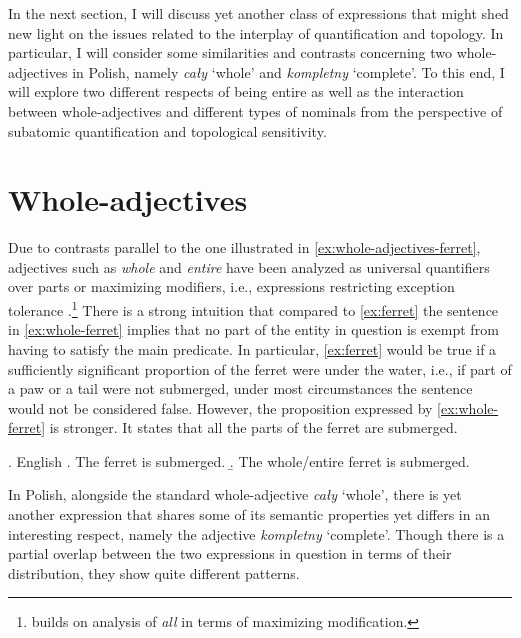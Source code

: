 In the next section, I will discuss yet another class of expressions that might shed new light on the issues related to the interplay of quantification and topology. In particular, I will consider some similarities and contrasts concerning two whole-adjectives in Polish, namely \textit{cały} `whole' and \textit{kompletny} `complete'. To this end, I will explore two different respects of being entire as well as the interaction between whole-adjectives and different types of nominals from the perspective of subatomic quantification and topological sensitivity.

\section{Whole-adjectives}\label{sec:whole-adjectives}

Due to contrasts parallel to the one illustrated in \ref{ex:whole-adjectives-ferret}, adjectives such as \textit{whole} and \textit{entire} have been analyzed as universal quantifiers over parts \citep{moltmann1997parts} or maximizing modifiers, i.e., expressions restricting exception tolerance \citep{morzycki2002wholes}.\footnote{\citet{morzycki2002wholes} builds on  analysis of \textit{all} in terms of maximizing modification.} There is a strong intuition that compared to \ref{ex:ferret} the sentence in \ref{ex:whole-ferret} implies that no part of the entity in question is exempt from having to satisfy the main predicate. In particular, \ref{ex:ferret} would be true if a sufficiently significant proportion of the ferret were under the water, i.e., if part of a paw or a tail were not submerged, under most circumstances the sentence would not be considered false. However, the proposition expressed by \ref{ex:whole-ferret} is stronger. It states that all the parts of the ferret are submerged.

\ex. English \citep{morzycki2002wholes}\label{ex:whole-adjectives-ferret}
\a. The ferret is submerged.\label{ex:ferret}
\b. The whole/entire ferret is submerged.\label{ex:whole-ferret}

In Polish, alongside the standard whole-adjective \textit{cały} `whole', there is yet another expression that shares some of its semantic properties yet differs in an interesting respect, namely the adjective \textit{kompletny} `complete'. Though there is a partial overlap between the two expressions in question in terms of their distribution, they show quite different patterns. 

